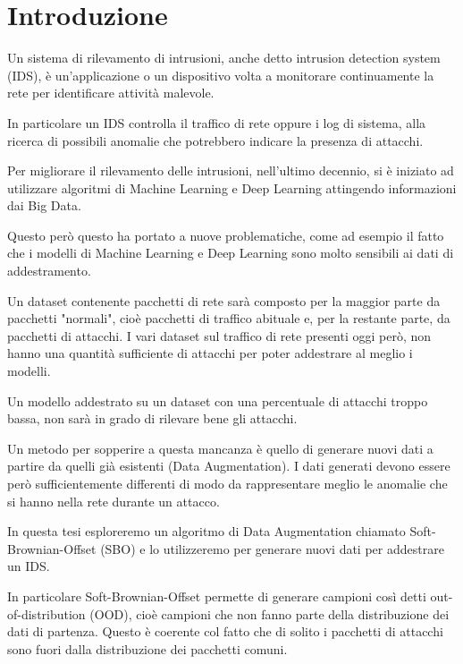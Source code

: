 \chapter{Introduzione}

Un sistema di rilevamento di intrusioni, anche detto intrusion detection system (IDS),  è un'applicazione o un dispositivo volta a monitorare continuamente la rete per identificare attività malevole. 

In particolare un IDS controlla il traffico di rete oppure i log di sistema, alla ricerca di possibili anomalie che potrebbero indicare la presenza di attacchi.

Per migliorare il rilevamento delle intrusioni, nell'ultimo decennio, si è iniziato ad utilizzare algoritmi di Machine Learning e Deep Learning attingendo informazioni dai Big Data. \cite{NetworkIntrusionDetection2021}

Questo però questo ha portato a nuove problematiche, come ad esempio il fatto che i modelli di Machine Learning e Deep Learning sono molto sensibili ai dati di addestramento.


Un dataset contenente pacchetti di rete sarà composto per la maggior parte da pacchetti "normali", cioè pacchetti di traffico abituale e, per la restante parte, da pacchetti di attacchi. 
I vari dataset sul traffico di rete presenti oggi però, non hanno una quantità sufficiente di attacchi per poter addestrare al meglio i modelli. 

Un modello addestrato su un dataset con una percentuale di attacchi troppo bassa, non sarà in grado di rilevare bene gli attacchi.

Un metodo per sopperire a questa mancanza è quello di generare nuovi dati a partire da quelli già esistenti (Data Augmentation). I dati generati devono essere però sufficientemente differenti di modo da rappresentare meglio le anomalie che si hanno nella rete durante un attacco.


In questa tesi esploreremo un algoritmo di Data Augmentation chiamato Soft-Brownian-Offset (SBO) \cite{sbo} e lo utilizzeremo per generare nuovi dati per addestrare un IDS.

In particolare Soft-Brownian-Offset permette di generare campioni così detti out-of-distribution (OOD), cioè campioni che non fanno parte della distribuzione dei dati di partenza. Questo è coerente col fatto che di solito i pacchetti di attacchi sono fuori dalla distribuzione dei pacchetti comuni.


